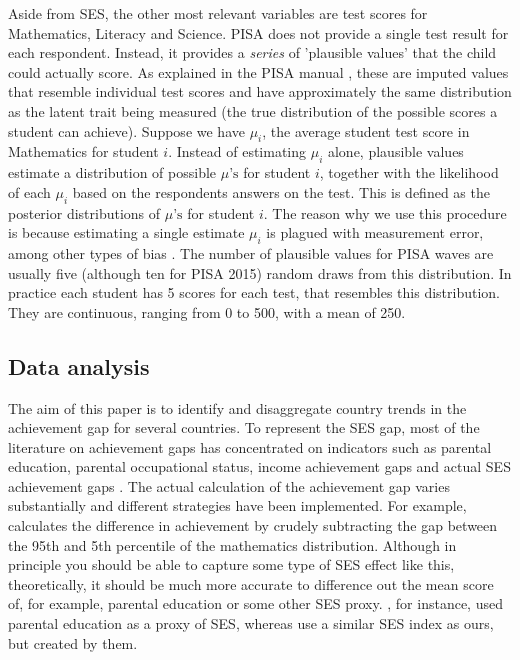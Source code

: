 \documentclass[11pt, a4paper]{article}\usepackage[]{graphicx}\usepackage[]{color}
\begin{document}
Aside from SES, the other most relevant variables are test scores for Mathematics, Literacy and Science. PISA does not provide a single test result for each respondent. Instead, it provides a \emph{series} of 'plausible values' that the child could actually score. As explained in the PISA manual \citep{pisa2012_technical}, these are imputed values that resemble individual test scores and have approximately the same distribution as the latent trait being measured (the true distribution of the possible scores a student can achieve). Suppose we have \(\mu_i\), the average student test score in Mathematics for student \(i\). Instead of estimating \(\mu_i\) alone, plausible values estimate a distribution of possible \(\mu\text{'s}\) for student \(i\), together with the likelihood of each \(\mu_i\) based on the respondents answers on the test. This is defined as the posterior distributions of \(\mu\text{'s}\) for student \(i\). The reason why we use this procedure is because estimating a single estimate \(\mu_i\) is plagued with measurement error, among other types of bias \citep[see][]{wu2005}. The number of plausible values for PISA waves are usually five (although ten for PISA 2015) random draws from this distribution. In practice each student has 5 scores for each test, that resembles this distribution. They are continuous, ranging from 0 to 500, with a mean of 250.

\subsection{Data analysis}

The aim of this paper is to identify and disaggregate country trends in the achievement gap for several countries. To represent the SES gap, most of the literature on achievement gaps has concentrated on indicators such as parental education, parental occupational status, income achievement gaps and actual SES achievement gaps \citep{fryer2004, hanushek_woesmann_tracking, saw2016, bradbury2015, byun2010}. The actual calculation of the achievement gap varies substantially and different strategies have been implemented. For example, \citet{micklewright} calculates the difference in achievement by crudely subtracting the gap between the 95th and 5th percentile of the mathematics distribution. Although in principle you should be able to capture some type of SES effect like this, theoretically, it should be much more accurate to difference out the mean score of, for example, parental education or some other SES proxy. \citet{saw2016}, for instance, used parental education as a proxy of SES, whereas \citet{byun2010} use a similar SES index as ours, but created by them.
\end{document}
